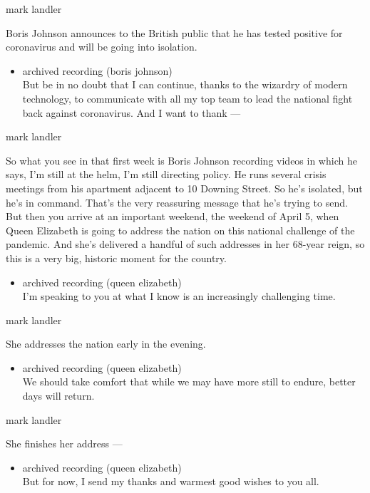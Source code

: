 mark landler

Boris Johnson announces to the British public that he has tested
positive for coronavirus and will be going into isolation.

\begin{itemize}
\tightlist
\item
  archived recording (boris johnson)\\
  But be in no doubt that I can continue, thanks to the wizardry of
  modern technology, to communicate with all my top team to lead the
  national fight back against coronavirus. And I want to thank ---
\end{itemize}

mark landler

So what you see in that first week is Boris Johnson recording videos in
which he says, I'm still at the helm, I'm still directing policy. He
runs several crisis meetings from his apartment adjacent to 10 Downing
Street. So he's isolated, but he's in command. That's the very
reassuring message that he's trying to send. But then you arrive at an
important weekend, the weekend of April 5, when Queen Elizabeth is going
to address the nation on this national challenge of the pandemic. And
she's delivered a handful of such addresses in her 68-year reign, so
this is a very big, historic moment for the country.

\begin{itemize}
\tightlist
\item
  archived recording (queen elizabeth)\\
  I'm speaking to you at what I know is an increasingly challenging
  time.
\end{itemize}

mark landler

She addresses the nation early in the evening.

\begin{itemize}
\tightlist
\item
  archived recording (queen elizabeth)\\
  We should take comfort that while we may have more still to endure,
  better days will return.
\end{itemize}

mark landler

She finishes her address ---

\begin{itemize}
\tightlist
\item
  archived recording (queen elizabeth)\\
  But for now, I send my thanks and warmest good wishes to you all.
\end{itemize}

